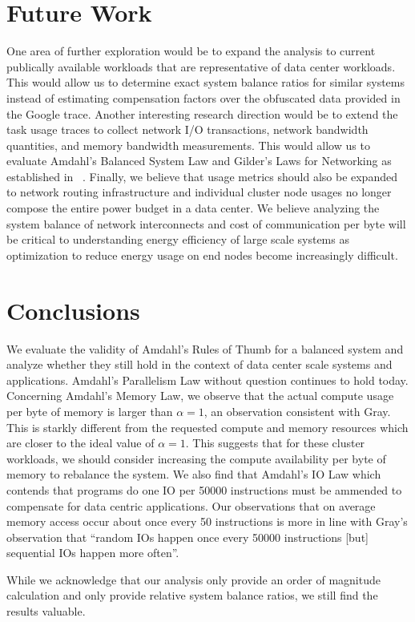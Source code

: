 \documentclass{sig-alternate}
\begin{document}
\section{Future Work}

One area of further exploration would be to expand the analysis to current publically available workloads that are representative of data center workloads.
This would allow us to determine exact system balance ratios for similar systems instead of estimating compensation factors over the obfuscated data provided in the Google trace.
Another interesting research direction would be to extend the task usage traces to collect network I/O transactions, network bandwidth quantities, and memory bandwidth measurements.
This would allow us to evaluate Amdahl's Balanced System Law and Gilder's Laws for Networking as established in ~\cite{export:68636}.
Finally, we believe that usage metrics should also be expanded to network routing infrastructure and individual cluster node usages no longer compose the entire power budget in a data center.
We believe analyzing the system balance of network interconnects and cost of communication per byte will be critical to understanding energy efficiency of large scale systems as optimization to reduce energy usage on end nodes become increasingly difficult.


\section{Conclusions}

We evaluate the validity of Amdahl's Rules of Thumb for a balanced system and analyze whether they still hold in the context of data center scale systems and applications.
Amdahl's Parallelism Law without question continues to hold today.
Concerning Amdahl's Memory Law, we observe that the actual compute usage per byte of memory is larger than $\alpha=1$, an observation consistent with Gray.
This is starkly different from the requested compute and memory resources which are closer to the ideal value of $\alpha=1$.
This suggests that for these cluster workloads, we should consider increasing the compute availability per byte of memory to rebalance the system.
We also find that Amdahl's IO Law which contends that programs do one IO per 50000 instructions must be ammended to compensate for data centric applications.
Our observations that on average memory access occur about once every 50 instructions is more in line with Gray's observation that ``random IOs happen once every 50000 instructions [but] sequential IOs happen more often''.

While we acknowledge that our analysis only provide an order of magnitude calculation and only provide relative system balance ratios, we still find the results valuable.





\end{document}
